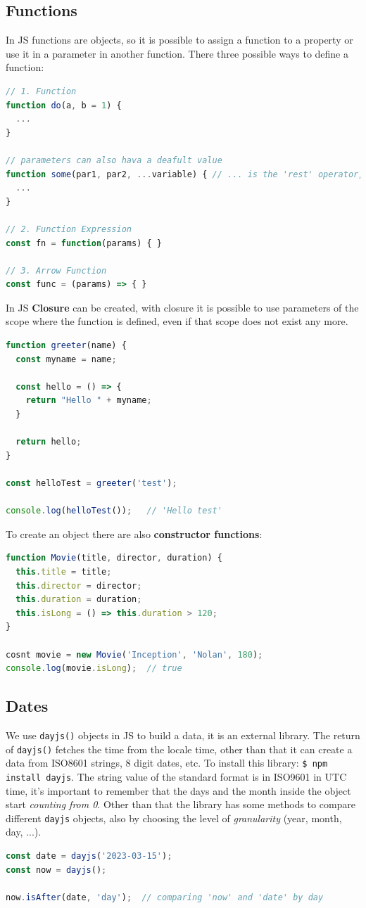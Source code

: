 \documentclass[12pt]{article}
\begin{document}
\subsection{Functions}
In JS functions are objects, so it is possible to assign a function to a property or use it in a parameter in another function. There three possible ways to define a function:
\begin{lstlisting}[language=js]
// 1. Function
function do(a, b = 1) {
  ...
}

// parameters can also hava a deafult value
function some(par1, par2, ...variable) { // ... is the 'rest' operator, like varargs, rest parameters can be iterated
  ...
}

// 2. Function Expression
const fn = function(params) { }

// 3. Arrow Function
const func = (params) => { }
\end{lstlisting}
In JS \textbf{Closure} can be created, with closure it is possible to use parameters of the scope where the function is defined, even if that scope does not exist any more.
\begin{lstlisting}[language=js]
function greeter(name) {
  const myname = name;

  const hello = () => {
    return "Hello " + myname;
  }

  return hello;
}

const helloTest = greeter('test');

console.log(helloTest());   // 'Hello test'
\end{lstlisting}
To create an object there are also \textbf{constructor functions}:
\begin{lstlisting}[language=js]
function Movie(title, director, duration) {
  this.title = title;
  this.director = director;
  this.duration = duration;
  this.isLong = () => this.duration > 120;
}

cosnt movie = new Movie('Inception', 'Nolan', 180);
console.log(movie.isLong);  // true
\end{lstlisting}


\subsection{Dates}
We use \texttt{dayjs()} objects in JS to build a data, it is an external library. The return of \texttt{dayjs()} fetches the time from the locale time, other than that it can create a data from ISO8601 strings, 8 digit dates, etc. To install this library: \texttt{\$ npm install dayjs}. The string value of the standard format is in ISO9601 in UTC time, it's important to remember that the days and the month inside the object start \emph{counting from 0}. Other than that the library has some methods to compare different \texttt{dayjs} objects, also by choosing the level of \emph{granularity} (year, month, day, ...).
\begin{lstlisting}[language=js]
const date = dayjs('2023-03-15');
const now = dayjs();

now.isAfter(date, 'day');  // comparing 'now' and 'date' by day
\end{lstlisting}
\end{document}
